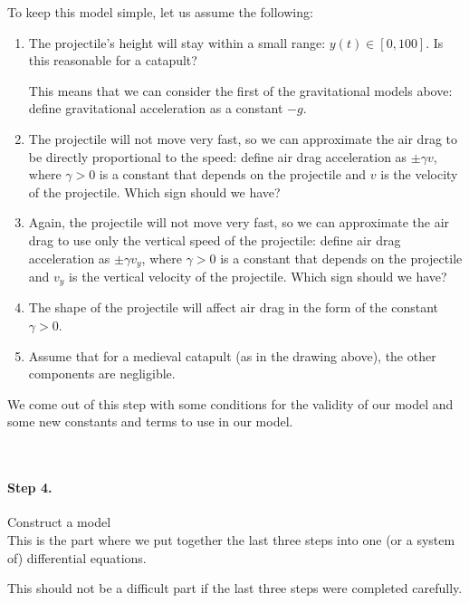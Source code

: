 \begin{example}
To keep this model simple, let us assume the following:
\begin{enumerate}
	\item The projectile's height will stay within a small range: $y(t) \in [0,100]$. Is this reasonable for a catapult?

		This means that we can consider the first of the gravitational models above: define gravitational acceleration as a constant $-g$.
		
	\item The projectile will not move very fast, so we can approximate the air drag to be directly proportional to the speed: define air drag acceleration as $\pm \gamma v$, where $\gamma>0$ is a constant that depends on the projectile and $v$ is the velocity of the projectile. Which sign should we have?

	\item Again, the projectile will not move very fast, so we can approximate the air drag to use only the vertical speed of the projectile: define air drag acceleration as $\pm \gamma v_y$, where $\gamma>0$ is a constant that depends on the projectile and $v_y$ is the vertical velocity of the projectile. Which sign should we have?

	\item The shape of the projectile will affect air drag in the form of the constant $\gamma>0$.

	\item Assume that for a medieval catapult (as in the drawing above), the other components are negligible.

\end{enumerate}

We come out of this step with some conditions for the validity of our model and some new constants and terms to use in our model.

\end{example}

\hfill \\

\paragraph{Step 4.} Construct a model \\

This is the part where we put together the last three steps into one (or a system of) differential equations.

This should not be a difficult part if the last three steps were completed carefully.

